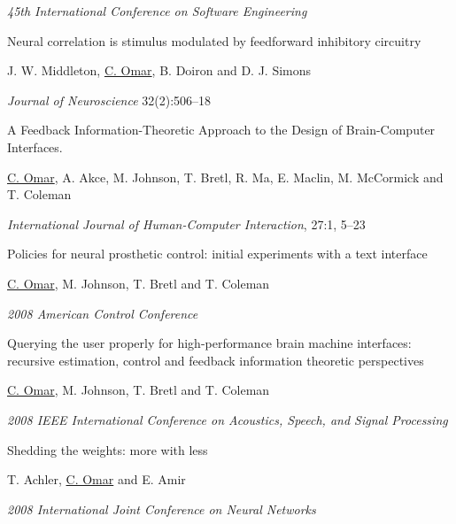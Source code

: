 \documentclass[10pt,letterpaper]{article}
\renewenvironment{itemize}{
  \begin{list}{}{
    \setlength{\leftmargin}{1.25em}
    \setlength{\itemsep}{0.25em}
    \setlength{\parskip}{0pt}
    \setlength{\parsep}{0.2em}
  }
}{
  \end{list}
}
\begin{document}
\begin{enumerate}[leftmargin=*, labelindent=6.5em, font=\bfseries]
\begin{itemize}
          \item \textit{45th International Conference on Software Engineering}
        \end{itemize}
  \item[J. Neuro. 2012] {Neural correlation is stimulus modulated by feedforward inhibitory circuitry}
        \begin{itemize}
          \item J. W. Middleton, \underline{C. Omar}, B. Doiron and D. J. Simons
          \item \textit{Journal of Neuroscience} 32(2):506--18
        \end{itemize}
  \item[IJHCI 2011] A Feedback Information-Theoretic Approach to the Design of Brain-Computer Interfaces.
        \begin{itemize}
          \item  \underline{C. Omar}, A. Akce, M. Johnson, T. Bretl, R. Ma, E. Maclin, M. McCormick and T. Coleman
          \item \textit{International Journal of Human-Computer Interaction}, 27:1, 5--23
        \end{itemize}
  \item[ACC 2008] Policies for neural prosthetic control: initial experiments with a text interface
        \begin{itemize}
          \item \underline{C. Omar}, M. Johnson, T. Bretl and T. Coleman
          \item \textit{2008 American Control Conference} 
        \end{itemize}
  \item[ICASSP 2008] Querying the user properly for high-performance brain machine interfaces: recursive estimation, control and feedback information theoretic perspectives
        \begin{itemize}
          \item \underline{C. Omar}, M. Johnson, T. Bretl and T. Coleman
          \item \textit{2008 IEEE International Conference on Acoustics, Speech, and Signal Processing}
        \end{itemize}
  \item[IJCNN 2008] Shedding the weights: more with less
        \begin{itemize}
          \item T. Achler, \underline{C. Omar} and E. Amir
          \item \textit{2008 International Joint Conference on Neural Networks}
        \end{itemize}

\end{enumerate}
\end{document}
